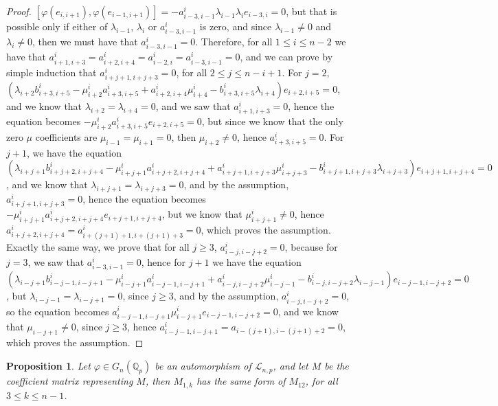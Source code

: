 \documentclass[12pt,fleqn]{article}
\newtheorem{proposition}[theorem]{Proposition}
\begin{document}
\begin{proof}
$[\varphi(e_{i,i+1}),\varphi(e_{i-1,i+1})]=-a_{i-3,i-1}^i\lambda_{i-1}\lambda_i e_{i-3,i}=0$, but that is possible only if either of $\lambda_{i-1}$, $\lambda_i$ or $a_{i-3,i-1}^i$ is zero, and since $\lambda_{i-1}\neq 0$ and $\lambda_i\neq 0$, then we must have that $a_{i-3,i-1}^i=0$. Therefore, for all $1\leq i\leq n-2$ we have that $a_{i+1,i+3}^i=a_{i+2,i+4}^i=a_{i-2,i}^i=a_{i-3,i-1}^i=0$, and we can prove by simple induction that $a_{i+j+1,i+j+3}^i=0$, for all $2\leq j\leq n-i+1$. For $j=2$, $(\lambda_{i+2}b_{i+3,i+5}^i-\mu_{i+2}^i a_{i+3,i+5}^i+a_{i+2,i+4}^i\mu_{i+4}^i-b_{i+3,i+5}^i\lambda_{i+4})e_{i+2,i+5}=0$, and we know that $\lambda_{i+2}=\lambda_{i+4}=0$, and we saw that $a_{i+1,i+3}^i=0$, hence the equation becomes $-\mu_{i+2}^i a_{i+3,i+5}^i e_{i+2,i+5}=0$, but since we know that the only zero $\mu$ coefficients are $\mu_{i-1}=\mu_{i+1}=0$, then $\mu_{i+2}\neq 0$, hence $a_{i+3,i+5}^i=0$. For $j+1$, we have the equation $(\lambda_{i+j+1}b_{i+j+2,i+j+4}^i-\mu_{i+j+1}^i a_{i+j+2,i+j+4}^i+a_{i+j+1,i+j+3}^i\mu_{i+j+3}^i-b_{i+j+1,i+j+3}^i\lambda_{i+j+3})e_{i+j+1,i+j+4}=0$, and we know that $\lambda_{i+j+1}=\lambda_{i+j+3}=0$, and by the assumption, $a_{i+j+1,i+j+3}^i=0$, hence the equation becomes $-\mu_{i+j+1}^i a_{i+j+2,i+j+4}^i e_{i+j+1,i+j+4}$, but we know that $\mu_{i+j+1}^i\neq 0$, hence $a_{i+j+2,i+j+4}^i=a_{i+(j+1)+1,i+(j+1)+3}^i=0$, which proves the assumption. Exactly the same way, we prove that for all $j\geq 3$, $a_{i-j,i-j+2}^i=0$, because for $j=3$, we saw that $a_{i-3,i-1}^i=0$, hence for $j+1$ we have the equation $(\lambda_{i-j+1}b_{i-j-1,i-j+1}^i-\mu_{i-j+1}^i a_{i-j-1,i-j+1}^i+a_{i-j,i-j+2}^i\mu_{i-j-1}^i-b_{i-j,i-j
+2}^i\lambda_{i-j-1})e_{i-j-1,i-j+2}=0$, but $\lambda_{i-j-1}=\lambda_{i-j+1}=0$, since $j\geq 3$, and by the assumption, $a_{i-j,i-j+2}^i=0$, so the equation becomes $a_{i-j-1,i-j+1}^i\mu_{i-j+1}^i e_{i-j-1,i-j+2}=0$, and we know that $\mu_{i-j+1}\neq 0$, since $j\geq 3$, hence $a_{i-j-1,i-j+1}^i=a_{i-(j+1),i-(j+1)+2}=0$, which proves the assumption.
\end{proof}
\begin{proposition}
Let $\varphi\in G_n(\mathbb{Q}_p)$ be an automorphism of $\mathcal{L}_{n,p}$, and let $M$ be the coefficient matrix representing $M$, then $M_{1,k}$ has the same form of $M_{12}$, for all $3\leq k\leq n-1$.
\end{proposition}
\end{document}
